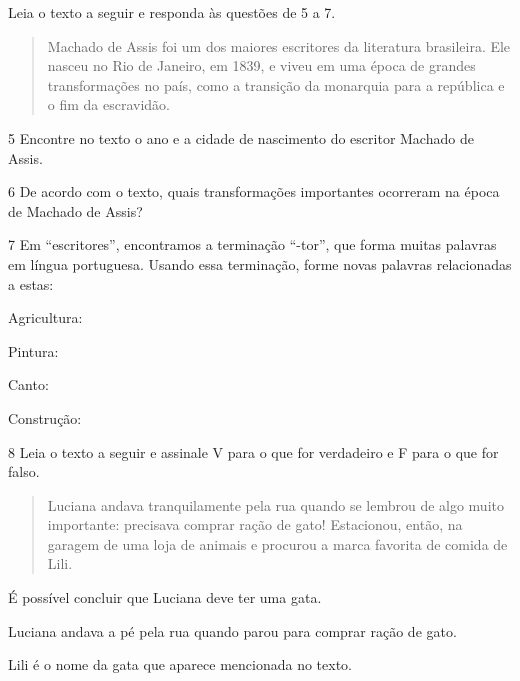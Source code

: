 Leia o texto a seguir e responda às questões de 5 a 7.

\begin{quote}
Machado de Assis foi um dos maiores escritores da literatura
brasileira. Ele nasceu no Rio de Janeiro, em 1839, e viveu em uma época
de grandes transformações no país, como a transição da monarquia para a
república e o fim da escravidão.
\end{quote}

\num{5} Encontre no texto o ano e a cidade de nascimento do escritor Machado de Assis.


\num{6} De acordo com o texto, quais transformações importantes ocorreram na época de Machado de Assis?


\num{7} Em ``escritores'', encontramos a terminação ``-tor'', que forma muitas palavras em língua portuguesa. Usando essa terminação, forme novas palavras relacionadas a estas:

\begin{escolha}
\item Agricultura: \preencher {}

\item Pintura: \preencher {}

\item Canto: \preencher {}

\item Construção: \preencher {}
\end{escolha}

\num{8} Leia o texto a seguir e assinale V para o que for verdadeiro e F para o que for falso.

\begin{quote}
Luciana andava tranquilamente pela rua quando se lembrou de algo muito
importante: precisava comprar ração de gato! Estacionou, então, na
garagem de uma loja de animais e procurou a marca favorita de comida de
Lili.
\end{quote}

\begin{boxlist}
 É possível concluir que Luciana deve ter uma gata.

 Luciana andava a pé pela rua quando parou para comprar ração de gato.

 Lili é o nome da gata que aparece mencionada no texto.
\end{boxlist}


